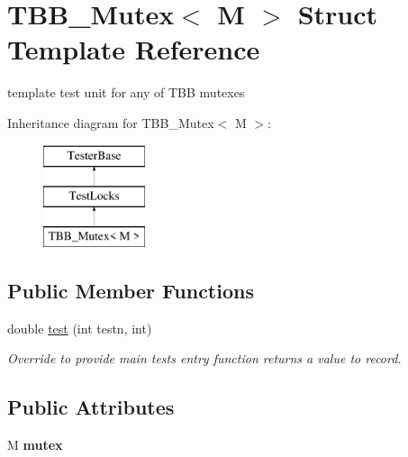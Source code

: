 \hypertarget{structTBB__Mutex}{}\section{T\+B\+B\+\_\+\+Mutex$<$ M $>$ Struct Template Reference}
\label{structTBB__Mutex}


template test unit for any of T\+B\+B mutexes  


Inheritance diagram for T\+B\+B\+\_\+\+Mutex$<$ M $>$\+:\begin{figure}[H]
\begin{center}
\leavevmode
\includegraphics[height=3.000000cm]{structTBB__Mutex}
\end{center}
\end{figure}
\subsection*{Public Member Functions}
\begin{DoxyCompactItemize}
\item 
\hypertarget{structTBB__Mutex_a451394bb529f8516fc2ca132fa936490}{}double \hyperlink{structTBB__Mutex_a451394bb529f8516fc2ca132fa936490}{test} (int testn, int)\label{structTBB__Mutex_a451394bb529f8516fc2ca132fa936490}

\begin{DoxyCompactList}\small\item\em Override to provide main test\textquotesingle{}s entry function returns a value to record. \end{DoxyCompactList}\end{DoxyCompactItemize}
\subsection*{Public Attributes}
\begin{DoxyCompactItemize}
\item 
\hypertarget{structTBB__Mutex_a7dcb2524c54ae8c69a93fb304b2cb6a8}{}M {\bfseries mutex}\label{structTBB__Mutex_a7dcb2524c54ae8c69a93fb304b2cb6a8}

\end{DoxyCompactItemize}
